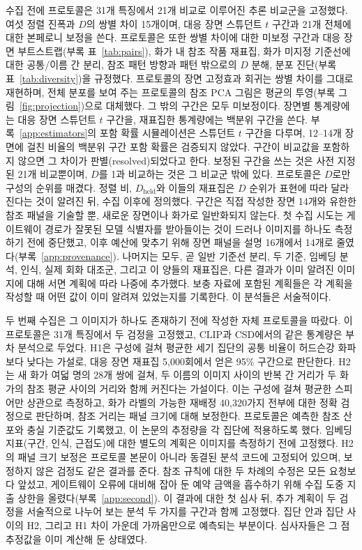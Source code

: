 \documentclass[10pt]{article}
\newcommand{\term}[1]{\textsf{#1}}
\begin{document}
수집 전에 프로토콜은 31개 특징에서 21개 비교로 이루어진 추론 비교군을 고정했다. 여섯 정렬 진폭과 $D$의
쌍별 차이 15개이며, 대응 장면 스튜던트 $t$ 구간과 21개 전체에 대한 본페로니 보정을 쓴다. 프로토콜은
또한 쌍별 차이에 대한 미보정 구간과 대응 장면 부트스트랩(부록 표~\ref{tab:pairs}), 화가 내 참조 작품
재표집, 화가 미지정 기준선에 대한 공통/이름 간 분리, 참조 패턴 방향과 패턴 밖으로의 $D$ 분해, 분포
진단(부록 표~\ref{tab:diversity})을 규정했다. 프로토콜의 장면 고정효과 회귀는 쌍별 차이를 그대로
재현하며, 전체 분포를 보여 주는 프로토콜의 참조 PCA 그림은 평균의 투영(부록 그림~\ref{fig:projection})으로
대체했다. 그 밖의 구간은 모두 미보정이다. 장면별 통계량에는 대응 장면 스튜던트 $t$ 구간을, 재표집한
통계량에는 백분위 구간을 쓴다. 부록~\ref{app:estimators}의 포함 확률 시뮬레이션은 스튜던트 $t$ 구간을
다루며, 12--14개 장면에 걸친 비율의 백분위 구간 포함 확률은 검증되지 않았다. 구간이 비교값을 포함하지
않으면 그 차이가 \term{판별}(resolved)되었다고 한다. 보정된 구간을 쓰는 것은 사전 지정된 21개 비교뿐이며,
$D$를 1과 비교하는 것은 그 비교군 밖에 있다. 프로토콜은 $D$로만 구성의 순위를 매겼다. 정렬 비,
$D_{\mathrm{held}}$와 이들의 재표집은 $D$ 순위가 표현에 따라 달라진다는 것이 알려진 뒤, 수집 이후에
정의했다. 구간은 직접 작성한 장면 14개와 유한한 참조 패널을 기술할 뿐, 새로운 장면이나 화가로 일반화되지
않는다. 첫 수집 시도는 게이트웨이 경로가 잘못된 모델 식별자를 받아들이는 것이 드러나 이미지를 하나도
측정하기 전에 중단했고, 이후 예산에 맞추기 위해 장면 패널을 설명 16개에서 14개로
줄였다(부록~\ref{app:provenance}). 나머지는 모두, 곧 일반 기준선 분리, 두 기준, 임베딩 분석, 인식, 실제
회화 대조군, 그리고 이 양들의 재표집은, 다른 결과가 이미 알려진 이미지에 대해 서면 계획에 따라 나중에
추가했다. 보충 자료에 포함된 계획들은 각 계획을 작성할 때 어떤 값이 이미 알려져 있었는지를 기록한다. 이
분석들은 서술적이다.

두 번째 수집은 그 이미지가 하나도 존재하기 전에 작성한 자체 프로토콜을 따랐다. 이 프로토콜은 31개
특징에서 두 검정을 고정했고, CLIP과 CSD에서의 같은 통계량은 부차 분석으로 두었다. H1은 구성에 걸쳐
평균한 세기 집단의 공통 비율이 허드슨강 화파보다 낮다는 가설로, 대응 장면 재표집 5,000회에서 얻은 95\%
구간으로 판단한다. H2는 새 화가 여덟 명의 28개 쌍에 걸쳐, 두 이름의 이미지 사이의 반복 간 거리가 두
화가의 참조 평균 사이의 거리와 함께 커진다는 가설이다. 이는 구성에 걸쳐 평균한 스피어만 상관으로
측정하고, 화가 라벨의 가능한 재배정 40,320가지 전부에 대한 정확 검정으로 판단하며, 참조 거리는 패널
크기에 대해 보정한다. 프로토콜은 예측한 참조 산포와 충실 기준값도 기록했고, 이 논문의 추정량을 각
집단에 적용하도록 했다. 임베딩 지표(구간, 인식, 근접도)에 대한 별도의 계획은 이미지를 측정하기 전에
고정했다. H2의 패널 크기 보정은 프로토콜 본문이 아니라 동결된 분석 코드에 고정되어 있으며, 보정하지
않은 검정도 같은 결과를 준다. 참조 규칙에 대한 두 차례의 수정은 모든 요청보다 앞섰고, 게이트웨이 오류에
대비해 잡아 둔 예약 금액을 흡수하기 위해 수집 도중 지출 상한을 올렸다(부록~\ref{app:second}). 이
결과에 대한 첫 심사 뒤, 추가 계획이 두 검정을 서술적으로 나누어 보는 분석 두 가지를 구간과 함께 고정했다. 집단 안과
집단 사이의 H2, 그리고 H1 차이 가운데 가까움만으로 예측되는 부분이다. 심사자들은 그 점추정값을 이미 계산해 둔
상태였다.
\end{document}
